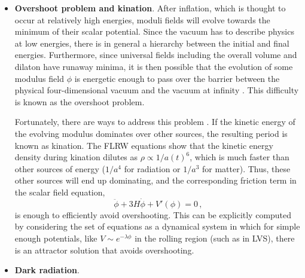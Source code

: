 \documentclass[12pt,a4wide]{article}
\def\be{\begin{equation}}
\def\ee{\end{equation}}
\begin{document}
\begin{itemize}
    \item{\bf Overshoot problem and kination}. 
    After inflation, which is thought to occur at relatively high energies,
    moduli fields will evolve towards the 
    minimum of their scalar potential. Since the vacuum has to describe physics at low energies, there is in general a hierarchy between the initial and final energies. Furthermore, since universal fields including the overall volume and dilaton have runaway minima, it is then possible that the evolution of some modulus field $\phi$ is energetic enough to pass over the barrier between the physical four-dimensional vacuum and the vacuum at infinity
    \cite{Brustein:1992nk}.  This difficulty is known as the overshoot problem.

    Fortunately, there are ways to address this problem \cite{Brustein:2004jp,Conlon:2008cj, Conlon:2022pnx,Apers:2022cyl}. 
    If the kinetic energy of the evolving modulus dominates over other sources, the resulting period is known as kination. The FLRW equations show that the kinetic energy density during kination dilutes as $\rho\propto 1/a(t)^6$, which is much faster than other sources of energy ($1/a^4$ for radiation or $1/a^3$ for matter).
    Thus, these other sources will end up dominating, and the corresponding friction term 
    in the scalar field equation,
    \be
    \ddot\phi+3H\dot\phi+V'(\phi)=0\,,
    \ee
    is enough to efficiently avoid overshooting. This can be explicitly computed by considering the set of equations as a dynamical system in which for simple enough potentials, like $V\sim e^{-\lambda \phi}$ in the rolling region (such as in LVS), there is an attractor solution that avoids overshooting.
    
    \item{\bf Dark radiation}.
 

\end{itemize}
\end{document}
